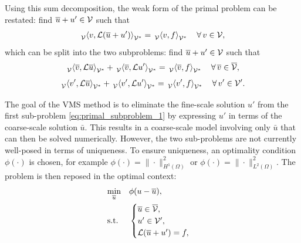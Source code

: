 Using this sum decomposition, the weak form of the
primal problem can be restated: find
$\overline{u} + u' \in \mathcal{V}$ such that
%
\begin{gather}
\,{}_{\mathcal{V}}^{}\!\left< {v}, {\mathcal{L}(\overline{u} + u')} \right>_{\mathcal{V}^*} = \,{}_{\mathcal{V}}^{}\!\left< {v}, {f} \right>_{\mathcal{V}^*}
\quad \forall \, v \in \mathcal{V},
\label{eq:primal_weak_decomp}
\end{gather}
%
which can be split into the two subproblems:
find $\overline{u} + u' \in \mathcal{V}$ such that
%
\begin{gather}
\,{}_{\mathcal{V}}^{}\!\left< {\overline{v}}, {\mathcal{L} \overline{u}} \right>_{\mathcal{V}^*} + \,{}_{\mathcal{V}}^{}\!\left< {\overline{v}}, {\mathcal{L} u'} \right>_{\mathcal{V}^*} =
\,{}_{\mathcal{V}}^{}\!\left< {\overline{v}}, {f} \right>_{\mathcal{V}^*}
\quad \forall \, \overline{v} \in \overline{\mathcal{V}},
\label{eq:primal_subproblem_1}
\end{gather}
%
\begin{gather}
\,{}_{\mathcal{V}}^{}\!\left< {v'}, {\mathcal{L} \overline{u}} \right>_{\mathcal{V}^*} + \,{}_{\mathcal{V}}^{}\!\left< {v'}, {\mathcal{L} u'} \right>_{\mathcal{V}^*} =
\,{}_{\mathcal{V}}^{}\!\left< {v'}, {f} \right>_{\mathcal{V}^*}
\quad \forall \, v' \in \mathcal{V}'.
\label{eq:primal_subproblem_2}
\end{gather}

The goal of the VMS method
is to eliminate the fine-scale
solution $u'$ from the first sub-problem
\eqref{eq:primal_subproblem_1} by expressing
$u'$ in terms of the coarse-scale solution
$\bar{u}$. This results in a coarse-scale
model involving only $\bar{u}$ that can then
be solved numerically. However, the two sub-problems
are not currently well-posed in terms of uniqueness.
To ensure uniqueness, an optimality
condition $\phi(\cdot)$ is chosen, for example
$\phi(\cdot) = \| \cdot \|^2 _{H^1(\Omega)}$ or
$\phi(\cdot) = \| \cdot \|^2 _{L^2(\Omega)}$.
The problem is then reposed in the optimal
context:
%
\begin{gather}
\begin{aligned}
& \underset{\overline{u}}{\text{min}}
& & \phi(u-\overline{u}), \\
& \text{s.t.}
& & \begin{cases}
\overline{u} \in \overline{\mathcal{V}}, \\
u' \in \mathcal{V}', \\
\mathcal{L} ( \overline{u} + u' ) = f,
\end{cases}
\end{aligned}
\label{eq:primal_optimality}
\end{gather}

